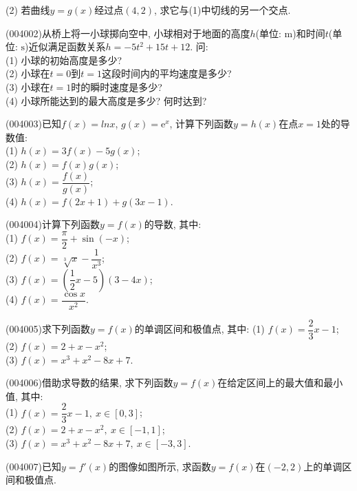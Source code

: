 (2) 若曲线$y=g(x)$经过点$(4,2)$, 求它与(1)中切线的另一个交点.
\item (004002)从桥上将一小球掷向空中, 小球相对于地面的高度$h$(单位: $\text{m}$)和时间$t$(单位: $\text{s}$)近似满足函数关系$h=-5t^2+15t+12$. 问:\\
(1) 小球的初始高度是多少?\\
(2) 小球在$t=0$到$t=1$这段时间内的平均速度是多少?\\
(3) 小球在$t=1$时的瞬时速度是多少?\\
(4) 小球所能达到的最大高度是多少? 何时达到?
\item (004003)已知$f(x)=lnx$, $g(x)=\mathrm{e}^x$, 计算下列函数$y=h(x)$在点$x=1$处的导数值:\\
(1) $h(x)=3f(x)-5g(x)$;\\
(2) $h(x)=f(x)g(x)$;\\
(3) $h(x)=\dfrac{f(x)}{g(x)}$;\\
(4) $h(x)=f(2x+1)+g(3x-1)$.
\item (004004)计算下列函数$y=f(x)$的导数, 其中:\\
(1) $f(x)=\dfrac\pi 2+\sin(-x)$;\\
(2) $f(x)=\sqrt[3]{x}-\dfrac{1}{x^3}$;\\
(3) $f(x)=(\dfrac 12 x-5)(3-4x)$;\\
(4) $f(x)=\dfrac{\cos x}{x^2}$.
\item (004005)求下列函数$y=f(x)$的单调区间和极值点, 其中:
(1) $f(x)=\dfrac 23 x-1$;\\
(2) $f(x)=2+x-x^2$;\\
(3) $f(x)=x^3+x^2-8x+7$.
\item (004006)借助求导数的结果, 求下列函数$y=f(x)$在给定区间上的最大值和最小值, 其中:\\
(1) $f(x)=\dfrac 23 x-1, \  x\in [0, 3]$;\\
(2) $f(x)=2+x-x^2, \ x\in [-1, 1]$;\\
(3) $f(x)=x^3+x^2-8x+7, \ x\in [-3, 3]$.
\item (004007)已知$y=f'(x)$的图像如图所示, 求函数$y=f(x)$在$(-2,2)$上的单调区间和极值点.
\begin{center}
\end{center}
